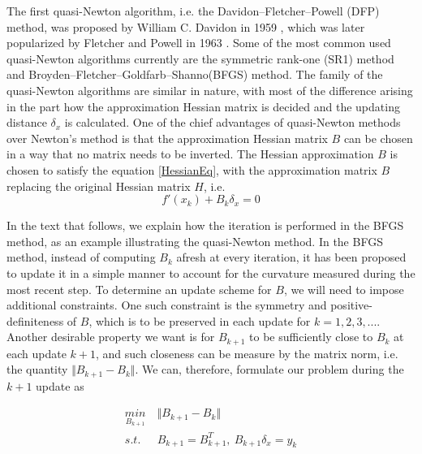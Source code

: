 The first quasi-Newton algorithm, i.e. the Davidon–Fletcher–Powell (DFP) method, was proposed by William C. Davidon in 1959 \cite{WilDav59}, which was later popularized by Fletcher and Powell in 1963 \cite{FlePow63}. Some of the most common used quasi-Newton algorithms currently are the symmetric rank-one (SR1) method \cite{ANP91} and Broyden–Fletcher–Goldfarb–Shanno(BFGS) method. The family of the quasi-Newton algorithms are similar in nature, with most of the difference arising in the part how the approximation Hessian matrix is decided and the updating distance $\delta_x $ is calculated. One of the chief advantages of quasi-Newton methods over Newton's method is that the approximation Hessian matrix $B$ can be chosen in a way that no matrix needs to be inverted. The Hessian approximation $B$ is chosen to satisfy the equation \ref{HessianEq}, with the approximation matrix $B$ replacing the original Hessian matrix $H$, i.e. 
\begin{equation}
	f'(x_k) +B_k\delta_x =0
	\label{HessianAppro}
\end{equation}

In the text that follows, we explain how the iteration is performed in the BFGS method, as an example illustrating the quasi-Newton method. In the BFGS method, instead of computing $B_k$ afresh at every iteration, it has been proposed to update it in a simple manner to account for the curvature measured during the most recent step. To determine an update scheme for $B$, we will need to impose additional constraints. One such constraint is the symmetry and positive-definiteness of $B$, which is to be preserved in each update for $k = 1,2, 3, ...$. Another desirable property we want is for $B_{k+1}$ to be sufficiently close to $B_k$ at each update $k+1$, and such closeness can be measure by the matrix norm, i.e. the quantity $\Vert B_{k+1} - B_{k} \Vert$. We can, therefore, formulate our problem during the $k+1$ update as 

\begin{equation}
	\begin{aligned}
		 \underset{B_{k+1}}{min} \  &  \Vert B_{k+1} - B_{k} \Vert\\
		s.t.\ \  & B_{k+1}= B_{k+1}^T, \ B_{k+1}\delta_x  = y_k \\
	\end{aligned}
	\label{BFGSB}
\end{equation}


